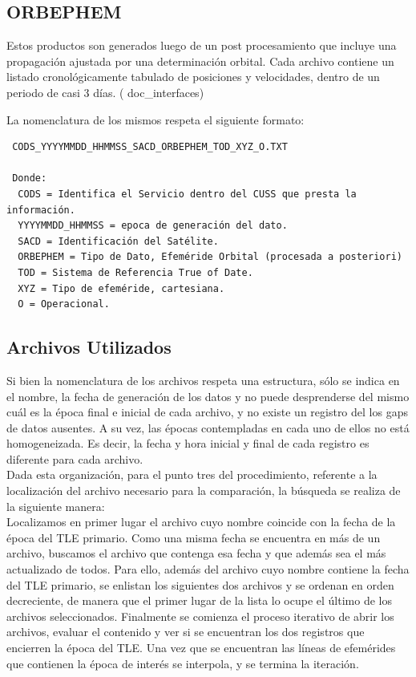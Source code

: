 \subsection{ORBEPHEM}
Estos productos son generados luego de un post procesamiento que incluye una propagaci\'on ajustada por una determinaci\'on orbital. 
Cada archivo contiene un listado cronol\'ogicamente tabulado de posiciones y velocidades, dentro de un periodo de casi 3 d\'ias. ( doc\_interfaces)

La nomenclatura de los mismos respeta el siguiente formato:\\
\begin{verbatim}
 CODS_YYYYMMDD_HHMMSS_SACD_ORBEPHEM_TOD_XYZ_O.TXT
 
 Donde:
  CODS = Identifica el Servicio dentro del CUSS que presta la información.
  YYYYMMDD_HHMMSS = epoca de generación del dato.
  SACD = Identificación del Satélite.
  ORBEPHEM = Tipo de Dato, Efeméride Orbital (procesada a posteriori)
  TOD = Sistema de Referencia True of Date.
  XYZ = Tipo de efeméride, cartesiana.
  O = Operacional. 
\end{verbatim}


\subsection{Archivos Utilizados}
Si bien la nomenclatura de los archivos respeta una estructura, s\'olo se indica en el nombre, la fecha de generaci\'on de los datos y no puede desprenderse del mismo cu\'al es la \'epoca final e inicial de cada archivo, y no existe un registro del los gaps de datos ausentes. A su vez, las \'epocas contempladas en cada uno de ellos no está homogeneizada. Es decir, la fecha y hora inicial y final de cada registro es diferente para cada archivo.\\
Dada esta organizaci\'on, para el punto tres del procedimiento, referente a la localizaci\'on del archivo necesario para la comparaci\'on, la b\'usqueda se realiza de la siguiente manera:\\
Localizamos en primer lugar el archivo cuyo nombre coincide con la fecha de la \'epoca del TLE primario.
Como una misma fecha se encuentra en m\'as de un archivo, buscamos el archivo que contenga esa fecha y que adem\'as sea el m\'as actualizado de todos. Para ello, además del archivo cuyo nombre contiene la fecha del TLE primario, se enlistan los siguientes dos archivos y se ordenan en orden decreciente, de manera que el primer lugar de la lista lo ocupe el \'ultimo de los archivos seleccionados. Finalmente se comienza el proceso iterativo de abrir los archivos, evaluar el contenido y ver si se encuentran los dos registros que encierren la \'epoca del TLE.
Una vez que se encuentran las l\'ineas de efem\'erides que contienen la \'epoca de inter\'es se interpola, y se termina la iteraci\'on.

